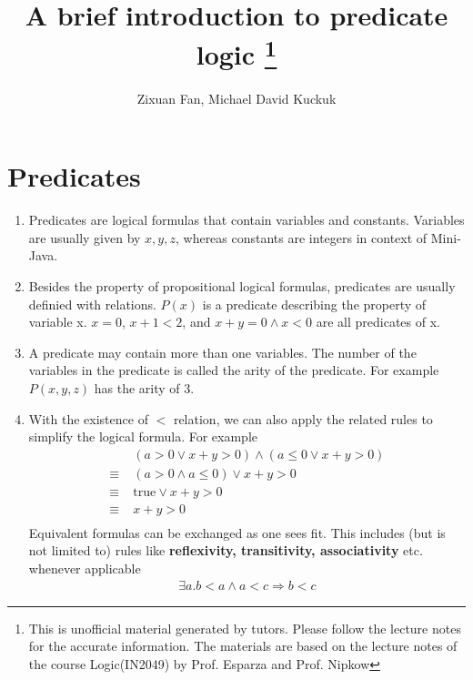 \documentclass[12pt]{article}
\title{A brief introduction to predicate logic \footnote{This is unofficial material generated by tutors. 
Please follow the lecture notes for the accurate information. The materials are based on the lecture notes 
of the course Logic(IN2049) by Prof. Esparza and Prof. Nipkow}}
\author{Zixuan Fan, Michael David Kuckuk}
\begin{document}
\maketitle

\section*{Predicates}
\begin{enumerate}
    \item Predicates are logical formulas that contain variables and constants. Variables are usually given by $x, y, z$, whereas constants are integers in context of Mini-Java.
    \item Besides the property of propositional logical formulas, predicates are usually definied with relations.
    $P(x)$ is a predicate describing the property of variable x. $x = 0$, $x + 1 < 2$, and $x + y = 0 \land x < 0$ are all 
    predicates of x.
    \item A predicate may contain more than one variables. The number of the variables in the predicate is
    called the arity of the predicate. For example $P(x, y, z)$ has the arity of 3.
    \item With the existence of $<$ relation, we can also apply the related rules to simplify the logical formula. For example
    \begin{align*}
        &\; (a > 0 \lor x + y > 0) \land (a \leq 0 \lor x + y > 0)\\
        \equiv& \; (a > 0 \land a \leq 0) \lor x + y > 0\\
        \equiv& \; \text{true} \lor x + y > 0\\
        \equiv& \; x + y > 0\\
    \end{align*}
    Equivalent formulas can be exchanged as one sees fit. This includes (but is not limited to) rules 
     like \textbf{reflexivity, transitivity, associativity} etc. whenever applicable
    \begin{align*}
        \exists a. b < a \land a < c \Longrightarrow b < c
    \end{align*}
\end{enumerate}
\end{document}
